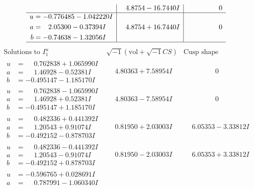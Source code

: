 \documentclass[1p]{elsarticle_modified}
\theoremstyle{definition}
\newcommand{\I}{\sqrt{-1}}
\begin{document}
$$\begin{array}{c|c|c}
 & \phantom{-}4.8754 - 16.7440 I & \phantom{-0.000000 } 0 \\ \hline\begin{aligned}
u &= -0.776485 - 1.042220 I \\
a &= \phantom{-}2.05300 - 0.37394 I \\
b &= -0.74638 - 1.32056 I\end{aligned}
 & \phantom{-}4.8754 + 16.7440 I & \phantom{-0.000000 } 0\\
 \hline 
 \end{array}$$\newpage$$\begin{array}{c|c|c}  
\text{Solutions to }I^u_{1}& \I (\text{vol} + \sqrt{-1}CS) & \text{Cusp shape}\\
 \hline 
\begin{aligned}
u &= \phantom{-}0.762838 + 1.065990 I \\
a &= \phantom{-}1.46928 - 0.52381 I \\
b &= -0.495147 - 1.185170 I\end{aligned}
 & \phantom{-}4.80363 + 7.58954 I & \phantom{-0.000000 } 0 \\ \hline\begin{aligned}
u &= \phantom{-}0.762838 - 1.065990 I \\
a &= \phantom{-}1.46928 + 0.52381 I \\
b &= -0.495147 + 1.185170 I\end{aligned}
 & \phantom{-}4.80363 - 7.58954 I & \phantom{-0.000000 } 0 \\ \hline\begin{aligned}
u &= \phantom{-}0.482336 + 0.441392 I \\
a &= \phantom{-}1.20543 + 0.91074 I \\
b &= -0.492152 - 0.878703 I\end{aligned}
 & \phantom{-}0.81950 + 2.03003 I & \phantom{-}6.05353 - 3.33812 I \\ \hline\begin{aligned}
u &= \phantom{-}0.482336 - 0.441392 I \\
a &= \phantom{-}1.20543 - 0.91074 I \\
b &= -0.492152 + 0.878703 I\end{aligned}
 & \phantom{-}0.81950 - 2.03003 I & \phantom{-}6.05353 + 3.33812 I \\ \hline\begin{aligned}
u &= -0.596765 + 0.028691 I \\
a &= \phantom{-}0.787991 - 1.060340 I \\

\end{aligned}
\end{array}$$
\end{document}
